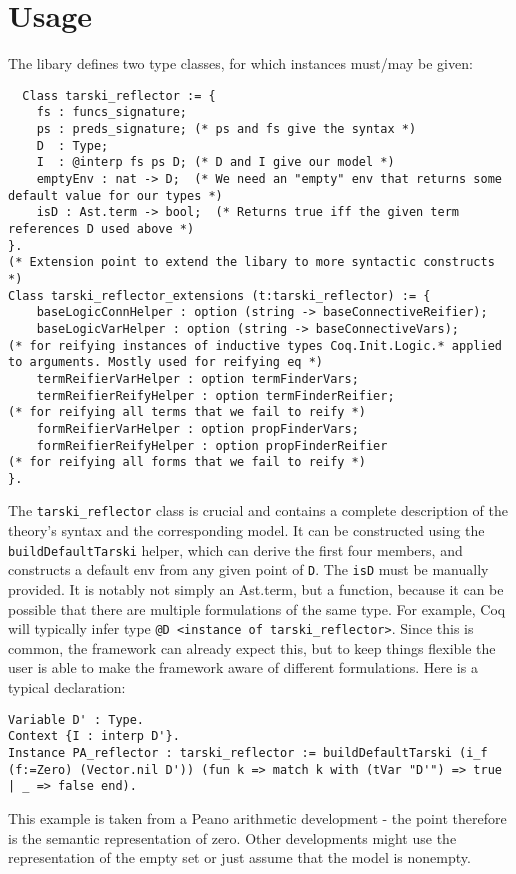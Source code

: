 \documentclass[11pt,a4paper]{article}
\begin{document}
\section{Usage}
The libary defines two type classes, for which instances must/may be given:
\begin{lstlisting}
  Class tarski_reflector := {
	fs : funcs_signature; 
	ps : preds_signature; (* ps and fs give the syntax *)
	D  : Type;
	I  : @interp fs ps D; (* D and I give our model *)
	emptyEnv : nat -> D;  (* We need an "empty" env that returns some default value for our types *)
	isD : Ast.term -> bool;  (* Returns true iff the given term references D used above *)
}. 
(* Extension point to extend the libary to more syntactic constructs *)
Class tarski_reflector_extensions (t:tarski_reflector) := {
	baseLogicConnHelper : option (string -> baseConnectiveReifier); 
	baseLogicVarHelper : option (string -> baseConnectiveVars);                 (* for reifying instances of inductive types Coq.Init.Logic.* applied to arguments. Mostly used for reifying eq *)
	termReifierVarHelper : option termFinderVars;    
	termReifierReifyHelper : option termFinderReifier;                          (* for reifying all terms that we fail to reify *)
	formReifierVarHelper : option propFinderVars;
	formReifierReifyHelper : option propFinderReifier                           (* for reifying all forms that we fail to reify *)
}.
\end{lstlisting}
The \lstinline|tarski_reflector| class is crucial and contains a complete description of the theory's syntax and the corresponding model. It can be constructed using the \lstinline|buildDefaultTarski| helper, which can derive the first four members, and constructs a default env from any given point of \lstinline|D|. The \lstinline|isD| must be manually provided. It is notably not simply an Ast.term, but a function, because it can be possible that there are multiple formulations of the same type. For example, Coq will typically infer type \lstinline|@D <instance of tarski_reflector>|. Since this is common, the framework can already expect this, but to keep things flexible the user is able to make the framework aware of different formulations. Here is a typical declaration:
\begin{lstlisting}
Variable D' : Type.
Context {I : interp D'}.
Instance PA_reflector : tarski_reflector := buildDefaultTarski (i_f (f:=Zero) (Vector.nil D')) (fun k => match k with (tVar "D'") => true | _ => false end).
\end{lstlisting}
This example is taken from a Peano arithmetic development - the point therefore is the semantic representation of zero. Other developments might use the representation of the empty set or just assume that the model is nonempty.
\end{document}
